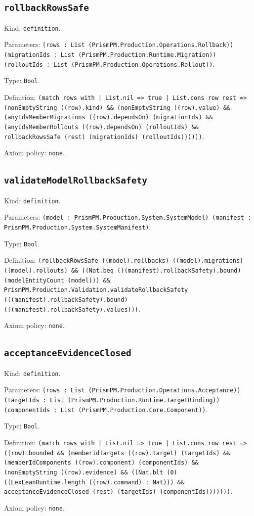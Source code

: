 \documentclass[11pt]{article}
\begin{document}
\subsection*{\texttt{rollbackRowsSafe}}
\noindent Kind: \texttt{definition}.\par
\noindent Parameters: \texttt{(rows : List (PrismPM.Production.Operations.Rollback)) (migrationIds : List (PrismPM.Production.Runtime.Migration)) (rolloutIds : List (PrismPM.Production.Operations.Rollout))}.\par
\noindent Type: \texttt{Bool}.\par
\noindent Definition: \texttt{(match rows with | List.nil => true | List.cons row rest => (nonEmptyString ((row).kind) \&\& (nonEmptyString ((row).value) \&\& (anyIdsMemberMigrations ((row).dependsOn) (migrationIds) \&\& (anyIdsMemberRollouts ((row).dependsOn) (rolloutIds) \&\& rollbackRowsSafe (rest) (migrationIds) (rolloutIds))))))}.\par
\noindent Axiom policy: \texttt{none}.\par
\subsection*{\texttt{validateModelRollbackSafety}}
\noindent Kind: \texttt{definition}.\par
\noindent Parameters: \texttt{(model : PrismPM.Production.System.SystemModel) (manifest : PrismPM.Production.System.SystemManifest)}.\par
\noindent Type: \texttt{Bool}.\par
\noindent Definition: \texttt{(rollbackRowsSafe ((model).rollbacks) ((model).migrations) ((model).rollouts) \&\& ((Nat.beq (((manifest).rollbackSafety).bound) (modelEntityCount (model))) \&\& PrismPM.Production.Validation.validateRollbackSafety (((manifest).rollbackSafety).bound) (((manifest).rollbackSafety).values)))}.\par
\noindent Axiom policy: \texttt{none}.\par
\subsection*{\texttt{acceptanceEvidenceClosed}}
\noindent Kind: \texttt{definition}.\par
\noindent Parameters: \texttt{(rows : List (PrismPM.Production.Operations.Acceptance)) (targetIds : List (PrismPM.Production.Runtime.TargetBinding)) (componentIds : List (PrismPM.Production.Core.Component))}.\par
\noindent Type: \texttt{Bool}.\par
\noindent Definition: \texttt{(match rows with | List.nil => true | List.cons row rest => ((row).bounded \&\& (memberIdTargets ((row).target) (targetIds) \&\& (memberIdComponents ((row).component) (componentIds) \&\& (nonEmptyString ((row).evidence) \&\& ((Nat.blt (0) ((LexLeanRuntime.length ((row).command) : Nat))) \&\& acceptanceEvidenceClosed (rest) (targetIds) (componentIds)))))))}.\par
\noindent Axiom policy: \texttt{none}.\par
\end{document}
